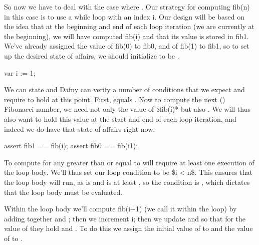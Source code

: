 \documentclass[letterpaper,10pt,english]{sphinxmanual}
\begin{document}
So now we have to deal with the case where . Our strategy for
computing fib(n) in this case is to use a while loop with an index i.
Our design will be based on the idea that at the beginning and end of
each loop iteration (we are currently at the beginning), we will have
computed fib(i) and that its value is stored in fib1. We’ve already
assigned the value of fib(0) to fib0, and of fib(1) to fib1, so to set
up the desired state of affairs, we should initialize  to be .

\begin{sphinxVerbatim}[commandchars=\\\{\}]
var i := 1;
\end{sphinxVerbatim}

We can state and Dafny can verify a number of conditions that we
expect and require to hold at this point. First,  equals
. Now to compute the next () Fibonacci number, we need
not only the value of \$fib(i)* but also . We will thus also
want  to hold this value at the start and end of each loop
iteration, and indeed we do have that state of affairs right now.

\begin{sphinxVerbatim}[commandchars=\\\{\}]
assert fib1 == fib(i);
assert fib0 == fib(i\PYGZhy{}1);
\end{sphinxVerbatim}

To compute  for any  greater than or equal to  will
require at least one execution of the loop body. We’ll thus set our
loop condition to be \$i \textless{} n\$. This ensures that the loop body will
run, as  is  and  is at least , so the condition 
is , which dictates that the loop body must be evaluated.

Within the loop body we’ll compute fib(i+1) (we call it  within
the loop) by adding together  and ; then we increment i;
then we update  and  so that for the  value of 
they hold  and . To do this we assign the initial
value of  to  and the value of  to .
\end{document}
